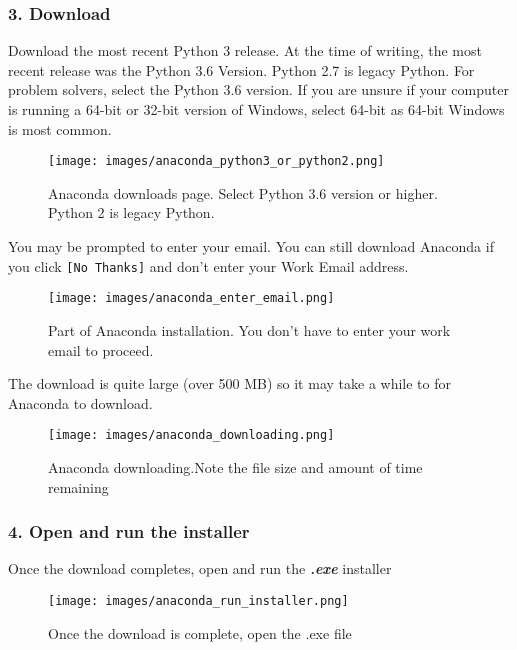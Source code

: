 \documentclass{book}
\makeatletter
\def\maxwidth{\ifdim\Gin@nat@width>\linewidth\linewidth
\else\Gin@nat@width\fi}
\let\Oldincludegraphics\includegraphics
\renewcommand{\includegraphics}[1]{\Oldincludegraphics[width=.8\maxwidth]{#1}}
\newcommand{\passthrough}[1]{#1}
\makeatother
\begin{document}
    
        \hypertarget{download}{%
\subsubsection{3. Download}\label{download}}

Download the most recent Python 3 release. At the time of writing, the
most recent release was the Python 3.6 Version. Python 2.7 is legacy
Python. For problem solvers, select the Python 3.6 version. If you are
unsure if your computer is running a 64-bit or 32-bit version of
Windows, select 64-bit as 64-bit Windows is most common.

\begin{figure}
\centering
\texttt{[image: images/anaconda\_python3\_or\_python2.png]}
\caption{Anaconda downloads page. Select Python 3.6 version or higher.
Python 2 is legacy Python.}
\end{figure}

You may be prompted to enter your email. You can still download Anaconda
if you click \passthrough{\lstinline![No Thanks]!} and don't enter your
Work Email address.

\begin{figure}
\centering
\texttt{[image: images/anaconda\_enter\_email.png]}
\caption{Part of Anaconda installation. You don't have to enter your
work email to proceed.}
\end{figure}

The download is quite large (over 500 MB) so it may take a while to for
Anaconda to download.

\begin{figure}
\centering
\texttt{[image: images/anaconda\_downloading.png]}
\caption{Anaconda downloading.Note the file size and amount of time
remaining}
\end{figure}
    




    
        \hypertarget{open-and-run-the-installer}{%
\subsubsection{4. Open and run the
installer}\label{open-and-run-the-installer}}

Once the download completes, open and run the \textbf{\emph{.exe}}
installer

\begin{figure}
\centering
\texttt{[image: images/anaconda\_run\_installer.png]}
\caption{Once the download is complete, open the .exe file}
\end{figure}
\end{document}
